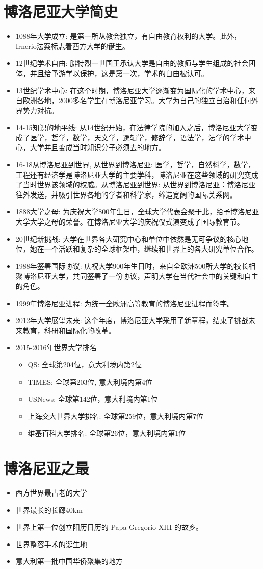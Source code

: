 \section{博洛尼亚大学简史}
\begin{itemize}
\item 1088年大学成立: 是第一所从教会独立，有自由教育权利的大学。此外，Irnerio法案\cite{irnerio}标志着西方大学的诞生。
\item 12世纪学术自由: 腓特烈一世国王承认大学是自由的教师与学生组成的社会团体，并且给予游学以保护，这是第一次，学术的自由被认可。
\item 13世纪学术中心: 在这个时期，博洛尼亚大学逐渐变为国际化的学术中心，来自欧洲各地，2000多名学生在博洛尼亚学习。大学为自己的独立自治和任何外界势力对抗。
\item 14-15知识的地平线: 从14世纪开始，在法律学院的加入之后，博洛尼亚大学变成了医学，哲学，数学，天文学，逻辑学，修辞学，语法学，法学的学术中心，大学并且变成当时知识分子必须去的地方。
\item 16-18从博洛尼亚到世界, 从世界到博洛尼亚: 医学，哲学，自然科学，数学，工程还有经济学是博洛尼亚大学的主要学科，博洛尼亚在这些领域的研究变成了当时世界该领域的权威。从博洛尼亚到世界: 从世界到博洛尼亚：博洛尼亚往外发送，并吸引世界各地的学者和科学家，缔造宽阔的国际关系网。
\item 1888大学之母: 为庆祝大学800年生日，全球大学代表会聚于此，给予博洛尼亚大学大学之母的荣誉。在博洛尼亚大学的庆祝仪式演变成了国际教育节。
\item 20世纪新挑战: 大学在世界各大研究中心和单位中依然是无可争议的核心地位，她在一个活跃和复杂的全球框架中，继续和世界上的各大研究单位合作。
\item 1988年签署国际协议: 庆祝大学900年生日时，来自全欧洲500所大学的校长相聚博洛尼亚大学，共同签署了一份协议，声明大学在当代社会中的关键和自主的角色。
\item 1999年博洛尼亚进程: 为统一全欧洲高等教育的博洛尼亚进程而签字。
\item 2012年大学展望未来: 这个年度，博洛尼亚大学采用了新章程，结束了挑战未来教育，科研和国际化的改革。
\item 2015-2016年世界大学排名
	\begin{itemize}
		\item QS\cite{qs}: 全球第204位，意大利境内第2位
		\item TIMES\cite{times}: 全球第203位, 意大利境内第4位
		\item USNews\cite{usnews}: 全球第142位，意大利境内第1位
		\item 上海交大世界大学排名\cite{shanghai}: 全球第259位，意大利境内第7位
		\item 维基百科大学排名\cite{weiji}: 全球第26位，意大利境内第1位
	\end{itemize}
\end{itemize}

\section{博洛尼亚之最}
\begin{itemize}
\item 西方世界最古老的大学
\item 世界最长的长廊40km
\item 世界上第一位创立阳历日历的 Papa Gregorio XIII 的故乡。
\item 世界整容手术的诞生地
\item 意大利第一批中国华侨聚集的地方
\end{itemize}

